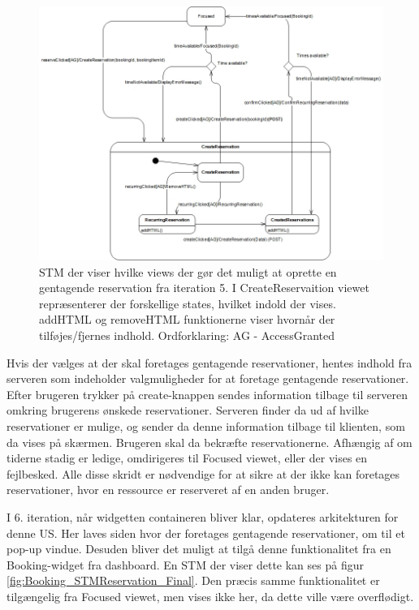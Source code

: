 \begin{figure}[H]
  \includegraphics[width=1.0\linewidth]{01_Billeder/09_Arkitektur/STM_CreateReservation_Initial.jpg}
  \caption{STM der viser hvilke views der gør det muligt at oprette en gentagende reservation fra iteration 5. I CreateReservaition viewet repræsenterer der forskellige states, hvilket indold der vises. addHTML og removeHTML funktionerne viser hvornår der tilføjes/fjernes indhold. Ordforklaring: AG - AccessGranted}
  \label{fig:Booking_STMReservation_Initial}
\end{figure}
 Hvis der vælges at der skal foretages gentagende reservationer, hentes indhold fra serveren som indeholder valgmuligheder for at foretage gentagende reservationer. Efter brugeren trykker på create-knappen sendes information tilbage til serveren omkring brugerens ønskede reservationer. Serveren finder da ud af hvilke reservationer er mulige, og sender da denne information tilbage til klienten, som da vises på skærmen. Brugeren skal da bekræfte reservationerne. Afhængig af om tiderne stadig er ledige, omdirigeres til Focused viewet, eller der vises en fejlbesked.
Alle disse skridt er nødvendige for at sikre at der ikke kan foretages reservationer, hvor en ressource er reserveret af en anden bruger.

I 6. iteration, når widgetten containeren bliver klar, opdateres arkitekturen for denne US. Her laves siden hvor der foretages gentagende reservationer, om til et pop-up vindue. Desuden bliver det muligt at tilgå denne funktionalitet fra en Booking-widget fra dashboard. En STM der viser dette kan ses på figur \ref{fig:Booking_STMReservation_Final}. Den præcis samme funktionalitet er tilgængelig fra Focused viewet, men vises ikke her, da dette ville være overflødigt. 

